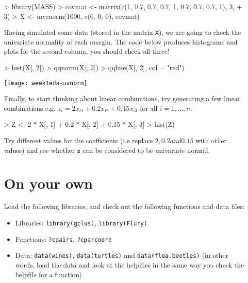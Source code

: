 \begin{Schunk}
\begin{Sinput}
> library(MASS)
> covmat <- matrix(c(1, 0.7, 0.7, 0.7, 1, 0.7, 0.7, 0.7, 1), 3, 
+     3)
> X <- mvrnorm(1000, c(0, 0, 0), covmat)
\end{Sinput}
\end{Schunk}


Having simulated some data (stored in the matrix \texttt{X}), we are going to check the univariate normality of each margin.   The code below produces histograms and plots for the second column, you should check all three!

\begin{Schunk}
\begin{Sinput}
> hist(X[, 2])
> qqnorm(X[, 2])
> qqline(X[, 2], col = "red")
\end{Sinput}
\end{Schunk}
\texttt{[image: week1eda-uvnorm]}

Finally, to start thinking about linear combinations, try generating a few linear combinations e.g. $z_{i} = 2x_{i1}+0.2x_{i2}+0.15x_{i3}$ for all $i = 1, \ldots, n$.

\begin{Schunk}
\begin{Sinput}
> Z <- 2 * X[, 1] + 0.2 * X[, 2] + 0.15 * X[, 3]
> hist(Z)
\end{Sinput}
\end{Schunk}

Try different values for the coefficients (i.e replace $2, 0.2 and 0.15$ with other values) and see whether $\boldsymbol{z}$ can be considered to be univariate normal.


\section{On your own}

Load the following libraries, and check out the following functions and data files:   

\begin{itemize}
\item Libraries: \texttt{library(gclus)}, \texttt{library(Flury)}
\item Functions: \texttt{?cpairs}, \texttt{?cparcoord} 
\item Data: \texttt{data(wines)}, \texttt{data(turtles)} and \texttt{data(flea.beetles)} (in other words, load the data and look at the helpfiles in the same way you check the helpfile for a function)
\end{itemize}



